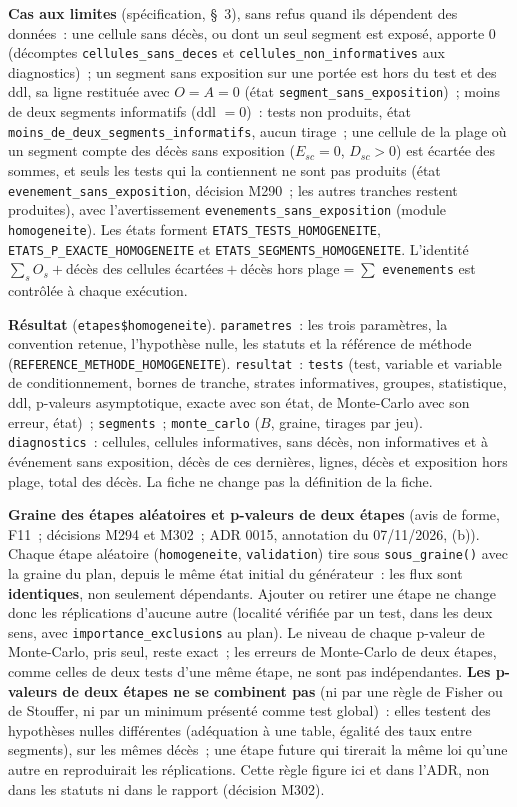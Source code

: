 \documentclass[a4paper,11pt]{article}
\newcommand{\code}[1]{\texttt{\small #1}}
\begin{document}
\medskip
\noindent
\textbf{Cas aux limites} (spécification, §~3), sans refus quand ils
dépendent des données~: une cellule sans décès, ou dont un seul segment
est exposé, apporte 0 (décomptes \code{cellules\_sans\_deces} et
\code{cellules\_non\_informatives} aux diagnostics)~; un segment sans
exposition sur une portée est hors du test et des ddl, sa ligne restituée
avec $O = A = 0$ (état \code{segment\_sans\_exposition})~; moins de deux
segments informatifs (ddl $= 0$)~: tests non produits, état
\code{moins\_de\_deux\_segments\_informatifs}, aucun tirage~; une cellule de
la plage où un segment compte des décès sans exposition ($E_{sc} = 0$,
$D_{sc} > 0$) est écartée des sommes, et seuls les tests qui la contiennent
ne sont pas produits (état \code{evenement\_sans\_exposition},
décision M290~; les autres tranches restent produites), avec
l'avertissement \code{evenements\_sans\_exposition} (module
\code{homogeneite}). Les états forment \code{ETATS\_TESTS\_HOMOGENEITE},
\code{ETATS\_P\_EXACTE\_HOMOGENEITE} et \code{ETATS\_SEGMENTS\_HOMOGENEITE}.
L'identité $\sum_s O_s + {}$décès des cellules écartées${} + {}$décès hors
plage${} = \sum$ \code{evenements} est contrôlée à chaque exécution.

\medskip
{\sloppy \textbf{Résultat} (\code{etapes\$homogeneite}).
\code{parametres}~: les trois paramètres, la convention retenue,
l'hypothèse nulle, les statuts et la référence de méthode
(\code{REFERENCE\_METHODE\_HOMOGENEITE}). \code{resultat}~: \code{tests}
(test, variable et variable de conditionnement, bornes de tranche,
strates informatives, groupes, statistique, ddl, p-valeurs asymptotique,
exacte avec son état, de Monte-Carlo avec son erreur, état)~;
\code{segments}~; \code{monte\_carlo} ($B$, graine, tirages par jeu).
\code{diagnostics}~: cellules, cellules informatives, sans décès, non
informatives et à événement sans exposition, décès de ces dernières,
lignes, décès et exposition hors plage, total des décès. La fiche ne
change pas la définition de la fiche.\par}

\medskip
\noindent
\textbf{Graine des étapes aléatoires et p-valeurs de deux étapes}
(avis de forme, F11~; décisions M294 et M302~; ADR 0015, annotation du
07/11/2026, (b)). Chaque étape aléatoire (\code{homogeneite},
\code{validation}) tire sous \code{sous\_graine()} avec la graine du plan,
depuis le même état initial du générateur~: les flux sont
\textbf{identiques}, non seulement dépendants. Ajouter ou retirer une étape
ne change donc les réplications d'aucune autre (localité vérifiée par un
test, dans les deux sens, avec \code{importance\_exclusions} au plan). Le
niveau de chaque p-valeur de Monte-Carlo, pris seul, reste exact~; les
erreurs de Monte-Carlo de deux étapes, comme celles de deux tests d'une
même étape, ne sont pas indépendantes. \textbf{Les p-valeurs de deux étapes
ne se combinent pas} (ni par une règle de Fisher ou de Stouffer, ni par un
minimum présenté comme test global)~: elles testent des hypothèses nulles
différentes (adéquation à une table, égalité des taux entre segments), sur
les mêmes décès~; une étape future qui tirerait la même loi qu'une autre en
reproduirait les réplications. Cette règle figure ici et dans l'ADR, non
dans les statuts ni dans le rapport (décision M302).
\end{document}
